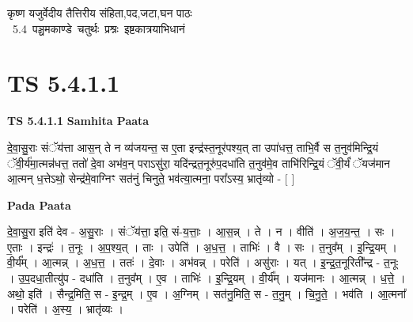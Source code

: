 \documentclass[17pt]{extarticle}
\begin{document}
\begin{titlepage}
    \begin{center}
 
\begin{sanskrit}
    { \Large
    कृष्ण यजुर्वेदीय तैत्तिरीय संहिता,पद,जटा,घन पाठः 
    }
    \\
    \vspace{2.5cm}
    \mbox{ \Large
    5.4      पञ्चमकाण्डे चतुर्थः प्रश्नः इष्टकात्रयाभिधानं   }
\end{sanskrit}
\end{center}

\end{titlepage}
\tableofcontents
{}
\pagebreak


\section{ TS 5.4.1.1 }

\textbf{TS 5.4.1.1 } \newline
\textbf{Samhita Paata} \newline

दे॒वा॒सु॒राः संॅय॑त्ता आस॒न् ते न व्य॑जयन्त॒ स ए॒ता इन्द्र॑स्त॒नूर॑पश्य॒त् ता उपा॑धत्त॒ ताभि॒र्वै स त॒नुव॑मिन्द्रि॒यं ॅवी॒र्य॑मा॒त्मन्न॑धत्त॒ ततो॑ दे॒वा अभ॑व॒न् पराऽसु॑रा॒ यदि॑न्द्रत॒नूरु॑प॒दधा॑ति त॒नुव॑मे॒व ताभि॑रिन्द्रि॒यं ॅवी॒र्यं॑ ॅयज॑मान आ॒त्मन् ध॒त्तेऽथो॒ सेन्द्र॑मे॒वाग्निꣳ सत॑नुं चिनुते॒ भव॑त्या॒त्मना॒ परा᳚ऽस्य॒ भ्रातृ॑व्यो - [  ] \newline

\textbf{Pada Paata} \newline

दे॒वा॒सु॒रा इति॑ देव - अ॒सु॒राः । संॅय॑त्ता॒ इति॒ सं-य॒त्ताः॒ । आ॒स॒न्न् । ते । न । वीति॑ । अ॒ज॒य॒न्त॒ । सः । ए॒ताः । इन्द्रः॑ । त॒नूः । अ॒प॒श्य॒त् । ताः । उपेति॑ । अ॒ध॒त्त॒ । ताभिः॑ । वै । सः । त॒नुव᳚म् । इ॒न्द्रि॒यम् । वी॒र्य᳚म् । आ॒त्मन्न् । अ॒ध॒त्त॒ । ततः॑ । दे॒वाः । अभ॑वन्न् । परेति॑ । असु॑राः । यत् । इ॒न्द्र॒त॒नूरिती᳚न्द्र - त॒नूः । उ॒प॒दधा॒तीत्यु॑प - दधा॑ति । त॒नुव᳚म् । ए॒व । ताभिः॑ । इ॒न्द्रि॒यम् । वी॒र्य᳚म् । यज॑मानः । आ॒त्मन्न् । ध॒त्ते॒ । अथो॒ इति॑ । सैन्द्र॒मिति॒ स - इ॒न्द्र॒म् । ए॒व । अ॒ग्निम् । सत॑नु॒मिति॒ स - त॒नु॒म् । चि॒नु॒ते॒ । भव॑ति । आ॒त्मना᳚ । परेति॑ । अ॒स्य॒ । भ्रातृ॑व्यः ।  \newline




\end{document}

